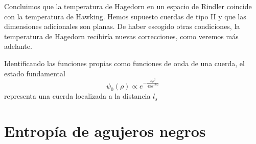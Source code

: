 Concluimos que la temperatura de Hagedorn en un espacio de Rindler coincide con la temperatura
de Hawking.
Hemos supuesto cuerdas de tipo II y que las dimensiones adicionales son planas.
De haber escogido otras condiciones, la temperatura de Hagedorn recibiría nuevas correcciones,
como veremos más adelante.

Identificando las funciones propias como funciones de onda de una cuerda, el estado fundamental
\begin{equation}
  \psi_0(\rho)\propto e^{-\frac{\beta \rho^2}{4\pi\alpha'^{3/2}} }
\end{equation}
representa una cuerda localizada a la distancia $l_s$




\section{Entropía de agujeros negros}
